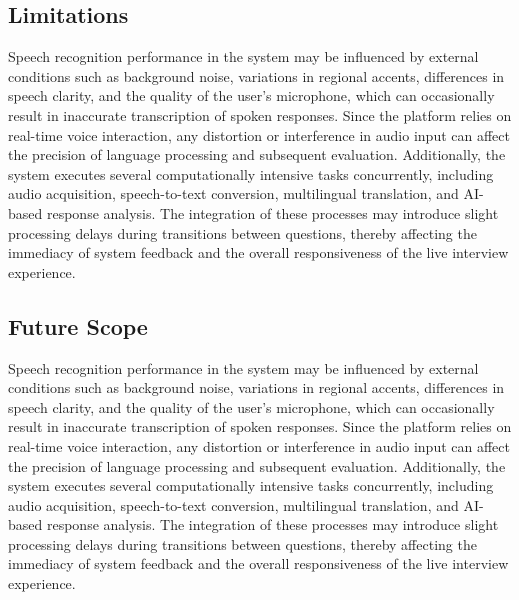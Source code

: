 \documentclass[12pt]{article}
\begin{document}
\subsection{Limitations}

Speech recognition performance in the system may be influenced by external conditions such as background noise, variations in regional accents, differences in speech clarity, and the quality of the user’s microphone, which can occasionally result in inaccurate transcription of spoken responses. Since the platform relies on real-time voice interaction, any distortion or interference in audio input can affect the precision of language processing and subsequent evaluation. Additionally, the system executes several computationally intensive tasks concurrently, including audio acquisition, speech-to-text conversion, multilingual translation, and AI-based response analysis. The integration of these processes may introduce slight processing delays during transitions between questions, thereby affecting the immediacy of system feedback and the overall responsiveness of the live interview experience.
\vspace{5pt}

\subsection{Future Scope}

Speech recognition performance in the system may be influenced by external conditions such as background noise, variations in regional accents, differences in speech clarity, and the quality of the user’s microphone, which can occasionally result in inaccurate transcription of spoken responses. Since the platform relies on real-time voice interaction, any distortion or interference in audio input can affect the precision of language processing and subsequent evaluation. Additionally, the system executes several computationally intensive tasks concurrently, including audio acquisition, speech-to-text conversion, multilingual translation, and AI-based response analysis. The integration of these processes may introduce slight processing delays during transitions between questions, thereby affecting the immediacy of system feedback and the overall responsiveness of the live interview experience.


\vspace{10pt}
\end{document}
